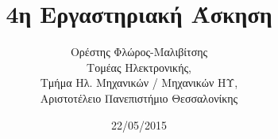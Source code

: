 
\usetikzlibrary{external}
\tikzexternalize
\newcommand{\deloldext}[2]{%
   \immediate\write18{./deloldext.pl '#1' '#2'}
}
\newcommand{\includetikz}[1]{%
    \tikzsetnextfilename{#1}%
    \deloldext{#1.tikz}{#1.pdf}%
}

\usepackage{fontspec}
\setmainfont{DejaVu Serif}
\renewcommand{\contentsname}{Περιεχόμενα}
\renewcommand{\listfigurename}{Λίστα Σχημάτων}
\renewcommand{\figurename}{Σχήμα}
\renewcommand{\lstlistingname}{Καταχώρηση}%
\renewcommand{\lstlistlistingname}{List of \lstlistingname s}




\title{4η Εργαστηριακή Άσκηση}
\author{Ορέστης Φλώρος-Μαλιβίτσης\\
  Τομέας Ηλεκτρονικής,\\
  Τμήμα Ηλ. Μηχανικών / Μηχανικών ΗΥ,\\
  Αριστοτέλειο Πανεπιστήμιο Θεσσαλονίκης}
\date{22/05/2015}

\newcommand{\fakealign}{%
   \mbox{\hspace{5cm}} & \mbox{\hspace{5cm}} \nonumber\\%
}


\maketitle
\tableofcontents
\listoffigures
\newpage


